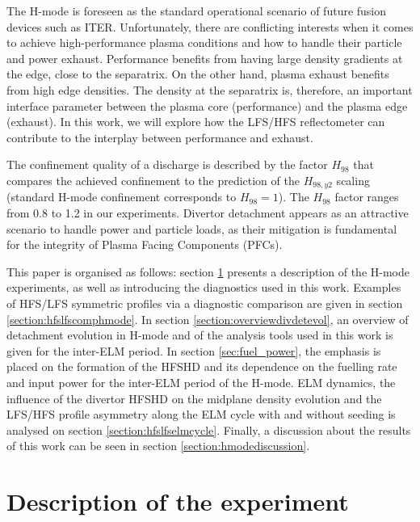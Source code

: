 \documentclass[12pt]{iopart}
\begin{document}
The H-mode is foreseen as the standard operational scenario of future fusion devices such as ITER. Unfortunately, there are conflicting interests when it comes to achieve high-performance plasma conditions and how to handle their particle and power exhaust. Performance benefits from having large density gradients at the edge, close to the separatrix\cite{schneider2014pedestal}. On the other hand, plasma exhaust benefits from high edge densities\cite{kallenbach2018parameter}. The density at the separatrix is, therefore, an important interface parameter between the plasma core (performance) and the plasma edge (exhaust). In this work, we will explore how the LFS/HFS reflectometer can contribute to the interplay between performance and exhaust.

The confinement quality of a discharge is described by the factor $H_{98}$ that compares the achieved confinement to the prediction of the $H_{98,y2}$\cite{ITER1999} scaling (standard H-mode confinement corresponds to $H_{98} = 1$). The $H_{98}$ factor ranges from 0.8 to 1.2 in our experiments. Divertor detachment appears as an attractive scenario to handle power and particle loads, as their mitigation is fundamental for the integrity of Plasma Facing Components (PFCs).

This paper is organised as follows: section \ref{section:descriptionhmode} presents a description of the H-mode experiments, as well as introducing the diagnostics used in this work. Examples of HFS/LFS symmetric profiles via a diagnostic comparison are given in section \ref{section:hfslfscomphmode}. In section \ref{section:overviewdivdetevol}, an overview of detachment evolution in H-mode and of the analysis tools used in this work is given for the inter-ELM period. In section \ref{sec:fuel_power}, the emphasis is placed on the formation of the HFSHD and its dependence on the fuelling rate and input power for the inter-ELM period of the H-mode. ELM dynamics, the influence of the divertor HFSHD on the midplane density evolution and the LFS/HFS profile asymmetry along the ELM cycle with and without seeding is analysed on section \ref{section:hfslfselmcycle}. Finally, a discussion about the results of this work can be seen in section \ref{section:hmodediscussion}.

\section{Description of the experiment}
\label{section:descriptionhmode}
\end{document}
